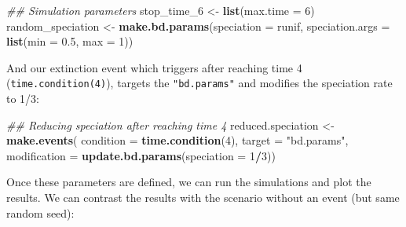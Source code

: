 \documentclass[
]{book}
\newenvironment{Shaded}{\begin{snugshade}}{\end{snugshade}}
\newcommand{\CommentTok}[1]{\textcolor[rgb]{0.56,0.35,0.01}{\textit{#1}}}
\newcommand{\DataTypeTok}[1]{\textcolor[rgb]{0.13,0.29,0.53}{#1}}
\newcommand{\DecValTok}[1]{\textcolor[rgb]{0.00,0.00,0.81}{#1}}
\newcommand{\FloatTok}[1]{\textcolor[rgb]{0.00,0.00,0.81}{#1}}
\newcommand{\KeywordTok}[1]{\textcolor[rgb]{0.13,0.29,0.53}{\textbf{#1}}}
\newcommand{\NormalTok}[1]{#1}
\newcommand{\OperatorTok}[1]{\textcolor[rgb]{0.81,0.36,0.00}{\textbf{#1}}}
\newcommand{\StringTok}[1]{\textcolor[rgb]{0.31,0.60,0.02}{#1}}
\begin{document}
\begin{Shaded}
\begin{Highlighting}[]
\CommentTok{\#\# Simulation parameters}
\NormalTok{stop\_time\_}\DecValTok{6}\NormalTok{ \textless{}{-}}\StringTok{ }\KeywordTok{list}\NormalTok{(}\DataTypeTok{max.time =} \DecValTok{6}\NormalTok{)}
\NormalTok{random\_speciation \textless{}{-}}\StringTok{ }\KeywordTok{make.bd.params}\NormalTok{(}\DataTypeTok{speciation =}\NormalTok{ runif, }\DataTypeTok{speciation.args =} \KeywordTok{list}\NormalTok{(}\DataTypeTok{min =} \FloatTok{0.5}\NormalTok{, }\DataTypeTok{max =} \DecValTok{1}\NormalTok{))}
\end{Highlighting}
\end{Shaded}

And our extinction event which triggers after reaching time 4 (\texttt{time.condition(4)}), targets the \texttt{"bd.params"} and modifies the speciation rate to 1/3:

\begin{Shaded}
\begin{Highlighting}[]
\CommentTok{\#\# Reducing speciation after reaching time 4}
\NormalTok{reduced.speciation \textless{}{-}}\StringTok{ }\KeywordTok{make.events}\NormalTok{(}
                      \DataTypeTok{condition    =} \KeywordTok{time.condition}\NormalTok{(}\DecValTok{4}\NormalTok{),}
                      \DataTypeTok{target       =} \StringTok{"bd.params"}\NormalTok{,}
                      \DataTypeTok{modification =} \KeywordTok{update.bd.params}\NormalTok{(}\DataTypeTok{speciation =} \DecValTok{1}\OperatorTok{/}\DecValTok{3}\NormalTok{))}
\end{Highlighting}
\end{Shaded}

Once these parameters are defined, we can run the simulations and plot the results.
We can contrast the results with the scenario without an event (but same random seed):
\end{document}
